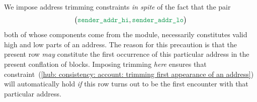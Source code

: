 	\saNote{} \label{hub: initialization phase: why we trim the sender address}
	We impose address trimming constraints \emph{in spite} of the fact that the pair
	\[
		\big( \locTxInitSenderAddressHi, \locTxInitSenderAddressLo \big)
	\]
	both of whose components come from the \userTxnDataMod{} module,
	necessarily constitutes valid high and low parts of an address.
	The reason for this precaution is that the present row \emph{may} constitute the first occurrence of this particular address in the present conflation of blocks.
	Imposing trimming \emph{here} ensures that
	constraint~(\ref{hub: consistency: account: trimming first appearance of an address})
	will automatically hold \emph{if} this row turns out to be the first encounter with that particular address.
